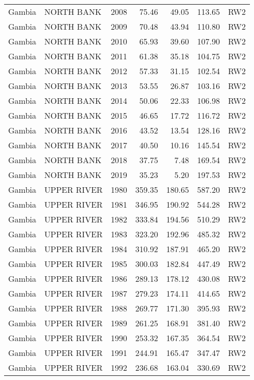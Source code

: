 \begin{longtable}{lllrrrl}
  Gambia & NORTH BANK & 2008 & 75.46 & 49.05 & 113.65 & RW2 \\ 
  Gambia & NORTH BANK & 2009 & 70.48 & 43.94 & 110.80 & RW2 \\ 
  Gambia & NORTH BANK & 2010 & 65.93 & 39.60 & 107.90 & RW2 \\ 
  Gambia & NORTH BANK & 2011 & 61.38 & 35.18 & 104.75 & RW2 \\ 
  Gambia & NORTH BANK & 2012 & 57.33 & 31.15 & 102.54 & RW2 \\ 
  Gambia & NORTH BANK & 2013 & 53.55 & 26.87 & 103.16 & RW2 \\ 
  Gambia & NORTH BANK & 2014 & 50.06 & 22.33 & 106.98 & RW2 \\ 
  Gambia & NORTH BANK & 2015 & 46.65 & 17.72 & 116.72 & RW2 \\ 
  Gambia & NORTH BANK & 2016 & 43.52 & 13.54 & 128.16 & RW2 \\ 
  Gambia & NORTH BANK & 2017 & 40.50 & 10.16 & 145.54 & RW2 \\ 
  Gambia & NORTH BANK & 2018 & 37.75 & 7.48 & 169.54 & RW2 \\ 
  Gambia & NORTH BANK & 2019 & 35.23 & 5.20 & 197.53 & RW2 \\ 
  Gambia & UPPER RIVER & 1980 & 359.35 & 180.65 & 587.20 & RW2 \\ 
  Gambia & UPPER RIVER & 1981 & 346.95 & 190.92 & 544.28 & RW2 \\ 
  Gambia & UPPER RIVER & 1982 & 333.84 & 194.56 & 510.29 & RW2 \\ 
  Gambia & UPPER RIVER & 1983 & 323.20 & 192.96 & 485.32 & RW2 \\ 
  Gambia & UPPER RIVER & 1984 & 310.92 & 187.91 & 465.20 & RW2 \\ 
  Gambia & UPPER RIVER & 1985 & 300.03 & 182.84 & 447.49 & RW2 \\ 
  Gambia & UPPER RIVER & 1986 & 289.13 & 178.12 & 430.08 & RW2 \\ 
  Gambia & UPPER RIVER & 1987 & 279.23 & 174.11 & 414.65 & RW2 \\ 
  Gambia & UPPER RIVER & 1988 & 269.77 & 171.30 & 395.93 & RW2 \\ 
  Gambia & UPPER RIVER & 1989 & 261.25 & 168.91 & 381.40 & RW2 \\ 
  Gambia & UPPER RIVER & 1990 & 253.32 & 167.35 & 364.54 & RW2 \\ 
  Gambia & UPPER RIVER & 1991 & 244.91 & 165.47 & 347.47 & RW2 \\ 
  Gambia & UPPER RIVER & 1992 & 236.68 & 163.04 & 330.69 & RW2 \\ 

\end{longtable}
